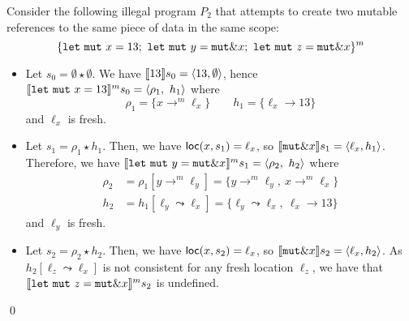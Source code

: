 \begin{example}
  Consider the following illegal program $P_2$
  that attempts to create two mutable references
  to the same piece of data in the same scope:
  \[
    \{
      \mathtt{let\ mut}\ x = 13;\
      \mathtt{let\ mut}\ y = \mathtt{mut}\borrow x;\
      \mathtt{let\ mut}\ z = \mathtt{mut}\borrow x
    \}^m
  \]
  \begin{itemize}
    \item Let $s_0=\emptyset \star \emptyset$.
    We have $\den[13]{s_0} = \langle 13,\emptyset\rangle$, hence
    $\denl[\mathtt{let\ mut}\ x = 13]{m}{s_0} =
    \langle \rho_1,\ h_1\rangle$ where
    \[\rho_1=\{x\to^m\ell_x\} \qquad
    h_1 = \{\ell_x\to 13\}\]
    and $\ell_x$ is fresh.
    \item Let $s_1 = \rho_1 \star h_1$.
    Then, we have $\loc(x,s_1) = \ell_x$, so
    $\den[\mathtt{mut}\borrow x]{s_1} = \langle \ell_x,h_1\rangle$.
    Therefore, we have
    $\denl[\mathtt{let\ mut}\ y = \mathtt{mut}\borrow x]{m}{s_1} =
    \langle \rho_2,\ h_2\rangle$
    where
    \begin{align*}
      \rho_2 & = \rho_1[y\to^m\ell_y] = \{y\to^m\ell_y,\ x\to^m\ell_x\}\\
      h_2 & = h_1[\ell_y\leadsto \ell_x] =
      \{\ell_y\leadsto \ell_x,\ \ell_x\to 13\}
    \end{align*}
    and $\ell_y$ is fresh.
    \item Let $s_2 = \rho_2 \star h_2$.
    Then, we have $\loc(x,s_2) = \ell_x$, so
    $\den[\mathtt{mut}\borrow x]{s_2} = \langle \ell_x,h_2\rangle$.
    As $h_2[\ell_z\leadsto \ell_x]$ is not consistent for any fresh location
    $\ell_z$, we have that
    $\denl[\mathtt{let\ mut}\ z = \mathtt{mut}\borrow x]{m}{s_2}$
    is undefined.
  \end{itemize}
  \qed
\end{example}

